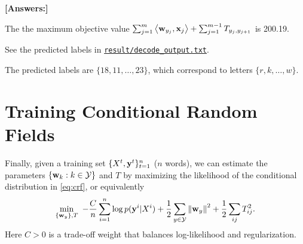 \documentclass[11pt]{report}
\begin{document}
\begin{itemize}
	{\bf [Answers:]} 

	The the maximum objective value $\sum_{j=1}^m \left\langle \mathbf{\boldsymbol{w}}_{y_j},\mathbf{\boldsymbol{x}}_j \right\rangle + \sum_{j=1}^{m-1} T_{y_j, y_{j+1}}$ is 200.19.  

	See the predicted labels in \underline{\texttt{result/decode\_output.txt}}. 

	The predicted labels are $\{18, 11, \ldots, 23\}$, which correspond to letters $\{r, k, \ldots, w\}$.
\end{itemize}

\section{Training Conditional Random Fields}

Finally, given a training set $\{X^t, \mathbf{\boldsymbol{y}}^t\}_{t=1}^n$ ($n$ words),
we can estimate the parameters $\{\mathbf{\boldsymbol{w}}_k : k \in \mathcal{Y}\}$ and $T$ by maximizing the likelihood of the conditional distribution in \eqref{eq:crf}, or equivalently
\begin{align}
	\label{eq:obj_MLE}
	\min_{\{\mathbf{\boldsymbol{w}}_y\}, T} \ -\frac{C}{n}\sum_{i=1}^n \log p(\mathbf{\boldsymbol{y}}^i | X^i) + \frac{1}{2} \sum_{y \in \mathcal{Y}} \left\|\mathbf{\boldsymbol{w}}_y\right\|^2 + \frac{1}{2} \sum_{ij} T^2_{ij}.
\end{align}
Here $C > 0$ is a trade-off weight that balances log-likelihood and regularization.
\end{document}
